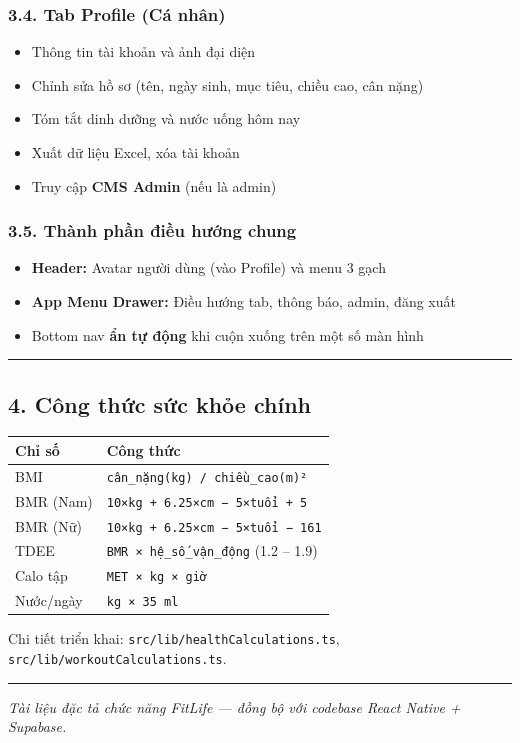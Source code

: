 \documentclass[12pt,a4paper]{article}
\newcounter{none}
\providecommand{\tightlist}{%
  \setlength{\itemsep}{0pt}\setlength{\parskip}{0pt}}
\begin{document}
\subsubsection{3.4. Tab Profile (Cá
nhân)}\label{tab-profile-cuxe1-nhuxe2n}

\begin{itemize}
\tightlist
\item
  Thông tin tài khoản và ảnh đại diện
\item
  Chỉnh sửa hồ sơ (tên, ngày sinh, mục tiêu, chiều cao, cân nặng)
\item
  Tóm tắt dinh dưỡng và nước uống hôm nay
\item
  Xuất dữ liệu Excel, xóa tài khoản
\item
  Truy cập \textbf{CMS Admin} (nếu là admin)
\end{itemize}

\subsubsection{3.5. Thành phần điều hướng
chung}\label{thuxe0nh-phux1ea7n-ux111iux1ec1u-hux1b0ux1edbng-chung}

\begin{itemize}
\tightlist
\item
  \textbf{Header:} Avatar người dùng (vào Profile) và menu 3 gạch
\item
  \textbf{App Menu Drawer:} Điều hướng tab, thông báo, admin, đăng xuất
\item
  Bottom nav \textbf{ẩn tự động} khi cuộn xuống trên một số màn hình
\end{itemize}

\begin{center}\rule{0.5\linewidth}{0.5pt}\end{center}

\subsection{4. Công thức sức khỏe
chính}\label{cuxf4ng-thux1ee9c-sux1ee9c-khux1ecfe-chuxednh}

{\def\LTcaptype{none} %
\begin{longtable}[]{@{}ll@{}}
\toprule\noalign{}
Chỉ số & Công thức \\
\midrule\noalign{}
\endhead
\bottomrule\noalign{}
\endlastfoot
BMI & \texttt{cân\_nặng(kg)\ /\ chiều\_cao(m)²} \\
BMR (Nam) & \texttt{10×kg\ +\ 6.25×cm\ −\ 5×tuổi\ +\ 5} \\
BMR (Nữ) & \texttt{10×kg\ +\ 6.25×cm\ −\ 5×tuổi\ −\ 161} \\
TDEE & \texttt{BMR\ ×\ hệ\_số\_vận\_động} (1.2 -- 1.9) \\
Calo tập & \texttt{MET\ ×\ kg\ ×\ giờ} \\
Nước/ngày & \texttt{kg\ ×\ 35\ ml} \\
\end{longtable}
}

Chi tiết triển khai: \texttt{src/lib/healthCalculations.ts},
\texttt{src/lib/workoutCalculations.ts}.

\begin{center}\rule{0.5\linewidth}{0.5pt}\end{center}

\emph{Tài liệu đặc tả chức năng FitLife --- đồng bộ với codebase React
Native + Supabase.}
\end{document}
